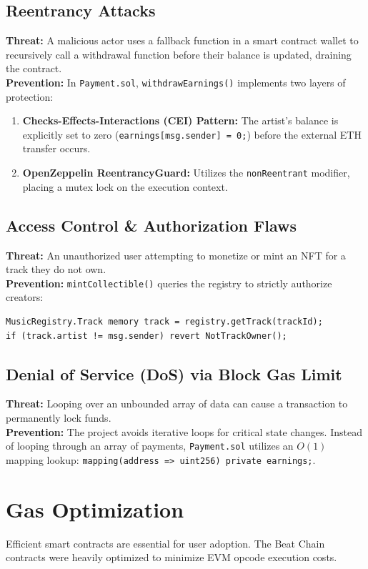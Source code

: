 \documentclass[11pt,a4paper]{article}
\begin{document}
\subsection{Reentrancy Attacks}
\textbf{Threat:} A malicious actor uses a fallback function in a smart contract wallet to recursively call a withdrawal function before their balance is updated, draining the contract. \\
\textbf{Prevention:} In \texttt{Payment.sol}, \texttt{withdrawEarnings()} implements two layers of protection:
\begin{enumerate}
    \item \textbf{Checks-Effects-Interactions (CEI) Pattern:} The artist's balance is explicitly set to zero (\texttt{earnings[msg.sender] = 0;}) before the external ETH transfer occurs.
    \item \textbf{OpenZeppelin ReentrancyGuard:} Utilizes the \texttt{nonReentrant} modifier, placing a mutex lock on the execution context.
\end{enumerate}

\subsection{Access Control \& Authorization Flaws}
\textbf{Threat:} An unauthorized user attempting to monetize or mint an NFT for a track they do not own. \\
\textbf{Prevention:} \texttt{mintCollectible()} queries the registry to strictly authorize creators:
\begin{verbatim}
MusicRegistry.Track memory track = registry.getTrack(trackId);
if (track.artist != msg.sender) revert NotTrackOwner();
\end{verbatim}

\subsection{Denial of Service (DoS) via Block Gas Limit}
\textbf{Threat:} Looping over an unbounded array of data can cause a transaction to permanently lock funds. \\
\textbf{Prevention:} The project avoids iterative loops for critical state changes. Instead of looping through an array of payments, \texttt{Payment.sol} utilizes an $O(1)$ mapping lookup: \texttt{mapping(address => uint256) private earnings;}.

\section{Gas Optimization}
Efficient smart contracts are essential for user adoption. The Beat Chain contracts were heavily optimized to minimize EVM opcode execution costs.
\end{document}
